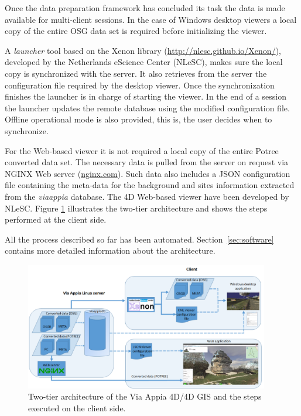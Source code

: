 Once the data preparation framework has concluded its task the data is made available
for multi-client sessions. In the case of Windows desktop viewers a local copy of the
entire OSG data set is required before initializing the viewer.

A \textit{launcher} tool based on the Xenon library (\url{http://nlesc.github.io/Xenon/}),
developed by the Netherlands eScience Center (NLeSC), makes sure the local copy is
synchronized with the server. It also retrieves from the server the configuration
file required by the desktop viewer. Once the synchronization finishes the launcher
is in charge of starting the viewer. In the end of a session the launcher updates
the remote database using the modified configuration file. Offline operational
mode is also provided, this is, the user decides when to synchronize.

For the Web-based viewer it is not required a local copy of the entire Potree converted
data set. The necessary data is pulled from the server on request via NGINX Web server
(\url{nginx.com}). Such data also includes a JSON configuration file containing the
meta-data for the background and sites information extracted from the {\em viaappia}
database. The 4D Web-based viewer have been developed by NLeSC. Figure \ref{fig:sys_arch_2tier}
illustrates the two-tier architecture and shows the steps performed at the client
side. 

All the process described so far has been automated. Section~\ref{sec:software} contains
more detailed information about the architecture. 

\begin{figure}[H] \centering
\includegraphics[width=0.95\textwidth]{fig/system_architecture/TwoTierArchitecture.pdf}
\caption{Two-tier architecture of the Via Appia 4D/4D GIS and the steps
executed on the client side.} \label{fig:sys_arch_2tier} \end{figure}
